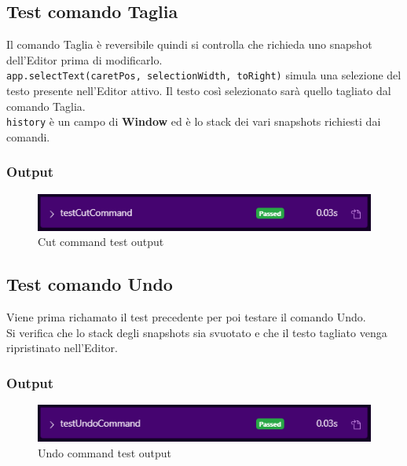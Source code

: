 \documentclass[12pt]{article}
\begin{document}
\subsection{Test comando Taglia}
Il comando Taglia è reversibile quindi si controlla che richieda uno snapshot dell'Editor prima di modificarlo.\\
\texttt{app.selectText(caretPos, selectionWidth, toRight)} simula una selezione del testo presente nell'Editor attivo. Il testo così selezionato sarà quello tagliato dal comando Taglia.\\
\texttt{history} è un campo di \textbf{Window} ed è lo stack dei vari snapshots richiesti dai comandi.\\
\begin{minipage}{\textwidth}

\end{minipage}
\subsubsection{Output}
\begin{figure}[H]
\centering
\includegraphics[width=\textwidth]{tests/testCutCommand.png}
\caption{Cut command test output}
\label{fig:testCutCommandOutput}
\end{figure}

\subsection{Test comando Undo}
Viene prima richamato il test precedente per poi testare il comando Undo.\\
Si verifica che lo stack degli snapshots sia svuotato e che il testo tagliato venga ripristinato nell'Editor.\\
\begin{minipage}{\textwidth}

\end{minipage}
\subsubsection{Output}
\begin{figure}[H]
\centering
\includegraphics[width=\textwidth]{tests/testUndoCommand.png}
\caption{Undo command test output}
\label{fig:testUndoCommandOutput}
\end{figure}
\end{document}
